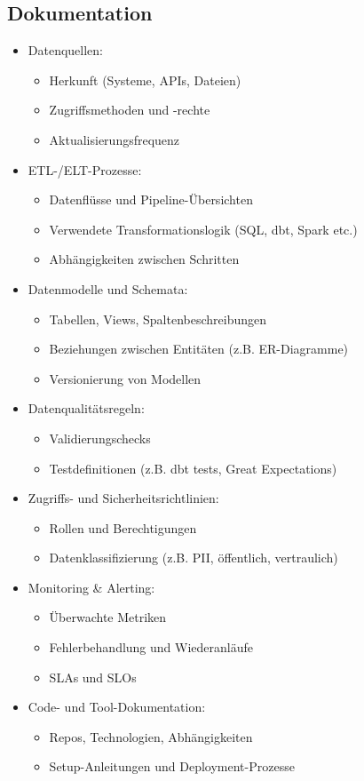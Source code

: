 \documentclass[11pt]{scrartcl}
\begin{document}
\subsection{Dokumentation}
\begin{itemize}
	\item Datenquellen:
	\begin{itemize}
		\item Herkunft (Systeme, APIs, Dateien)
		\item Zugriffsmethoden und -rechte
		\item Aktualisierungsfrequenz
	\end{itemize}
	\item ETL-/ELT-Prozesse:
	\begin{itemize}
		\item Datenflüsse und Pipeline-Übersichten
		\item Verwendete Transformationslogik (SQL, dbt, Spark etc.)
		\item Abhängigkeiten zwischen Schritten
	\end{itemize}
	\item Datenmodelle und Schemata:
	\begin{itemize}
		\item Tabellen, Views, Spaltenbeschreibungen
		\item Beziehungen zwischen Entitäten (z.B. ER-Diagramme)
		\item Versionierung von Modellen
	\end{itemize}
	\item Datenqualitätsregeln:
	\begin{itemize}
		\item Validierungschecks
		\item Testdefinitionen (z.B. dbt tests, Great Expectations)
	\end{itemize}
	\item Zugriffs- und Sicherheitsrichtlinien:
	\begin{itemize}
		\item Rollen und Berechtigungen
		\item Datenklassifizierung (z.B. PII, öffentlich, vertraulich)
	\end{itemize}
	\item Monitoring \& Alerting:
	\begin{itemize}
		\item Überwachte Metriken
		\item Fehlerbehandlung und Wiederanläufe
		\item SLAs und SLOs
	\end{itemize}
	\item Code- und Tool-Dokumentation:
	\begin{itemize}
		\item Repos, Technologien, Abhängigkeiten
		\item Setup-Anleitungen und Deployment-Prozesse
	\end{itemize}
\end{itemize}
\end{document}
